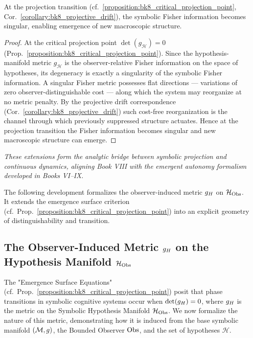 \begin{corollary}
\label{corollary:bk8_projection_transition_enabling_structural_emergence}
At the projection transition (cf.~\ref{proposition:bk8_critical_projection_point}, Cor.~\ref{corollary:bk8_projective_drift}), the symbolic Fisher information becomes singular, enabling emergence of new macroscopic structure.
\end{corollary}
\begin{proof}
\label{proof:bk8_projection_transition_enabling_structural_emergence}
\leavevmode
At the critical projection point $\det(g_{\mathcal{H}})=0$ (Prop.~\ref{proposition:bk8_critical_projection_point}). Since the hypothesis-manifold metric $g_{\mathcal{H}}$ is the observer-relative Fisher information on the space of hypotheses, its degeneracy is exactly a singularity of the symbolic Fisher information. A singular Fisher metric possesses flat directions --- variations of zero observer-distinguishable cost --- along which the system may reorganize at no metric penalty. By the projective drift correspondence (Cor.~\ref{corollary:bk8_projective_drift}) such cost-free reorganization is the channel through which previously suppressed structure actuates. Hence at the projection transition the Fisher information becomes singular and new macroscopic structure can emerge.
\end{proof}
\begin{center}
\textit{These extensions form the analytic bridge between symbolic projection and continuous dynamics, aligning Book VIII with the emergent autonomy formalism developed in Books VI--IX.}
\end{center}
\begin{scholium}
\label{scholium:bk8_observer_induced_hypothesis_metric}
\leavevmode\newline
The following development formalizes the observer-induced metric \(g_H\)
on \(\mathcal{H}_{\mathrm{Obs}}\).
It extends the emergence surface criterion
(cf.~Prop.~\ref{proposition:bk8_critical_projection_point}) into an explicit
geometry of distinguishability and transition.
\end{scholium}

\subsection{\texorpdfstring{The Observer-Induced Metric $g_H$ on the Hypothesis Manifold $\mathcal{H}_{\mathrm{Obs}}$}{The Observer-Induced Metric g\_H on the Hypothesis Manifold H\_O}}
\label{subsec:bk8_hypotheses_manifold}
The "Emergence Surface Equations" (cf.~Prop.~\ref{proposition:bk8_critical_projection_point}) posit that phase transitions in symbolic cognitive systems occur when \(\det(g_H) = 0\), where \(g_H\) is the metric on the Symbolic Hypothesis Manifold \(\mathcal{H}_{\mathrm{Obs}}\). We now formalize the nature of this metric, demonstrating how it is induced from the base symbolic manifold \((\mathcal{M}, g)\), the Bounded Observer \(\mathrm{Obs}\), and the set of hypotheses \(\mathcal{H}\).

